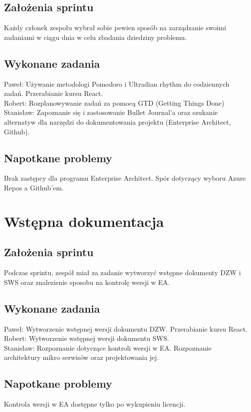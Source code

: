 \documentclass[a4paper,11pt]{report}
\begin{document}
\subsection {Założenia sprintu}
Każdy członek zespołu wybrał sobie pewien sposób na zarządzanie swoimi zadaniami w ciągu dnia w celu zbadania dziedziny problemu.
\subsection {Wykonane zadania}
Paweł: Używanie metodologi Pomodoro i Ultradian rhythm do codziennych zadań. Przerabianie kursu React.\\
Robert: Rozplanowywanie zadań za pomocą GTD (Getting Things Done)\\
Stanisław: Zapoznanie się i zastosowanie Bullet Journal'a oraz szukanie alternatyw dla narzędzi do dokumentowania projektu (Enterprise Architect, Github).\\
\subsection {Napotkane problemy}
Brak zastępcy dla programu Enterprise Architect. Spór dotyczący wyboru Azure Repos a Github'em.

\section {Wstępna dokumentacja}
\subsection {Założenia sprintu}
Podczas sprintu, zespół miał za zadanie wytworzyć wstępne dokumenty DZW i SWS oraz znalezienie sposobu na kontrolę wersji w EA.
\subsection {Wykonane zadania}
Paweł: Wytworzenie wstępnej wersji dokumentu DZW. Przerabianie kursu React.\\
Robert: Wytworzenie wstępnej wersji dokumentu SWS.\\
Stanisław: Rozpoznanie dotyczące kontroli wersji w EA. Rozpoznanie architektury mikro serwisów oraz projektowania jej.\\
\subsection {Napotkane problemy} 
Kontrola wersji w EA dostępne tylko po wykupieniu licencji.
\end{document}
